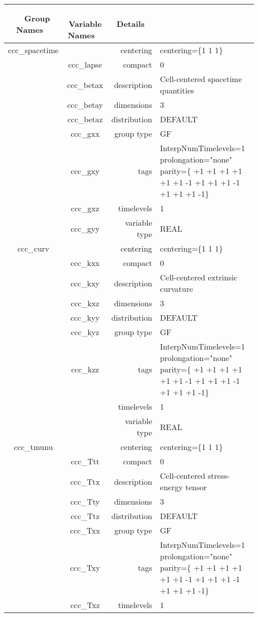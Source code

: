 \begin{tabular*}{150mm}{|c|c@{\extracolsep{\fill}}|rl|} \hline 
~ {\bf Group Names} ~ & ~ {\bf Variable Names} ~  &{\bf Details} ~ & ~\\ 
\hline 
ccc\_spacetime &  & centering & centering=\{1 1 1\} \\ 
 & ccc\_lapse & compact & 0 \\ 
 & ccc\_betax & description & Cell-centered spacetime quantities \\ 
 & ccc\_betay & dimensions & 3 \\ 
 & ccc\_betaz & distribution & DEFAULT \\ 
 & ccc\_gxx & group type & GF \\ 
 & ccc\_gxy & tags & InterpNumTimelevels=1 prolongation="none" parity=\{ +1 +1 +1  +1 +1 +1  -1 +1 +1  +1 -1 +1  +1 +1 -1\} \\ 
 & ccc\_gxz & timelevels & 1 \\ 
 & ccc\_gyy & variable type & REAL \\ 
\hline 
ccc\_curv &  & centering & centering=\{1 1 1\} \\ 
 & ccc\_kxx & compact & 0 \\ 
 & ccc\_kxy & description & Cell-centered extrinsic curvature \\ 
 & ccc\_kxz & dimensions & 3 \\ 
 & ccc\_kyy & distribution & DEFAULT \\ 
 & ccc\_kyz & group type & GF \\ 
 & ccc\_kzz & tags & InterpNumTimelevels=1 prolongation="none" parity=\{ +1 +1 +1  +1 +1 +1  -1 +1 +1  +1 -1 +1  +1 +1 -1\} \\ 
 &  & timelevels & 1 \\ 
 &  & variable type & REAL \\ 
\hline 
ccc\_tmunu &  & centering & centering=\{1 1 1\} \\ 
 & ccc\_Ttt & compact & 0 \\ 
 & ccc\_Ttx & description & Cell-centered stress-energy tensor \\ 
 & ccc\_Tty & dimensions & 3 \\ 
 & ccc\_Ttz & distribution & DEFAULT \\ 
 & ccc\_Txx & group type & GF \\ 
 & ccc\_Txy & tags & InterpNumTimelevels=1 prolongation="none" parity=\{ +1 +1 +1  +1 +1 +1  -1 +1 +1  +1 -1 +1  +1 +1 -1\} \\ 
 & ccc\_Txz & timelevels & 1 \\ 

\end{tabular*}
